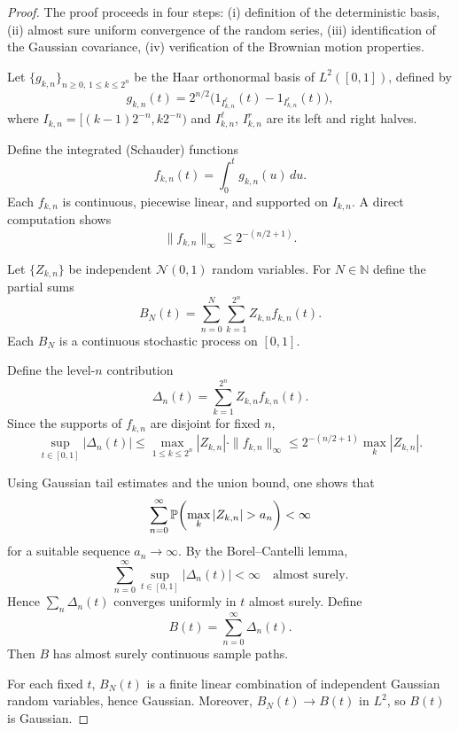 \begin{proof}

The proof proceeds in four steps:
(i) definition of the deterministic basis,
(ii) almost sure uniform convergence of the random series,
(iii) identification of the Gaussian covariance,
(iv) verification of the Brownian motion properties.


Let $\{g_{k,n}\}_{n\ge0,\,1\le k\le2^n}$ be the Haar orthonormal basis of $L^2([0,1])$,
defined by
\[
g_{k,n}(t)
=
2^{n/2}\big(1_{I_{k,n}^\ell}(t)-1_{I_{k,n}^r}(t)\big),
\]
where $I_{k,n}=[(k-1)2^{-n},k2^{-n})$ and $I_{k,n}^\ell$, $I_{k,n}^r$ are its left and right
halves.

Define the integrated (Schauder) functions
\[
f_{k,n}(t)=\int_0^t g_{k,n}(u)\,du.
\]
Each $f_{k,n}$ is continuous, piecewise linear, and supported on $I_{k,n}$.
A direct computation shows
\[
\|f_{k,n}\|_\infty \le 2^{-(n/2+1)}.
\]


Let $\{Z_{k,n}\}$ be independent $\mathcal N(0,1)$ random variables.
For $N\in\mathbb{N}$ define the partial sums
\[
B_N(t)=\sum_{n=0}^N\sum_{k=1}^{2^n} Z_{k,n} f_{k,n}(t).
\]
Each $B_N$ is a continuous stochastic process on $[0,1]$.


Define the level-$n$ contribution
\[
\Delta_n(t)=\sum_{k=1}^{2^n} Z_{k,n} f_{k,n}(t).
\]
Since the supports of $f_{k,n}$ are disjoint for fixed $n$,
\[
\sup_{t\in[0,1]}|\Delta_n(t)|
\le \max_{1\le k\le2^n}|Z_{k,n}|\cdot \|f_{k,n}\|_\infty
\le 2^{-(n/2+1)} \max_{k}|Z_{k,n}|.
\]

Using Gaussian tail estimates and the union bound, one shows that
\[
\sum_{n=0}^\infty \mathbb{P}\!\left(\max_{k}|Z_{k,n}| > a_n\right)<\infty
\]
for a suitable sequence $a_n\to\infty$.
By the Borel--Cantelli lemma,
\[
\sum_{n=0}^\infty \sup_{t\in[0,1]}|\Delta_n(t)| < \infty
\quad\text{almost surely}.
\]
Hence $\sum_n \Delta_n(t)$ converges uniformly in $t$ almost surely.
Define
\[
B(t)=\sum_{n=0}^\infty \Delta_n(t).
\]
Then $B$ has almost surely continuous sample paths.


For each fixed $t$, $B_N(t)$ is a finite linear combination of independent Gaussian
random variables, hence Gaussian. Moreover, $B_N(t)\to B(t)$ in $L^2$, so $B(t)$ is
Gaussian.


\end{proof}
